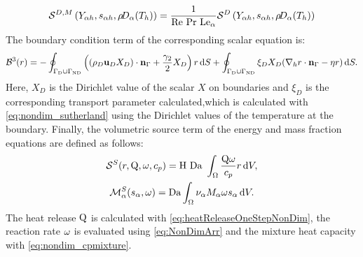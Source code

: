 \begin{equation}
\mathcal{S}^{D,M}\left(Y_{\alpha h},s_{\alpha h},\rho\!D_\alpha(T_h)\right) = \frac{1}{\text{Re}~\text{Pr}~\text{Le}_\alpha} \mathcal{S}^D\left(Y_{\alpha h},s_{\alpha h},\rho\!D_\alpha(T_h)\right)
\end{equation}
The boundary condition term of the corresponding scalar equation is:
\begin{equation}
	\mathcal{B}^3(r) =  -
	\oint_{\Gamma_{\text{D}}\cup \Gamma_{\text{ND}}}{ \left( (\rho_D\textbf{u}_D X_D)\cdot \textbf{n}_{\Gamma} + \frac{\gamma_2}{2}X_D\right)r \,\mathrm{d} S}
	+\oint_{\Gamma_{\text{D}}\cup \Gamma_{\text{ND}}} \xi_D X_D(\nabla_h r \cdot \textbf{n}_{\Gamma} - \eta r )\,\mathrm{d} S.
\end{equation}
Here, $X_D$ is the Dirichlet value of the scalar $X$ on boundaries and $\xi_D$ is the corresponding transport parameter calculated,which is calculated with \cref{eq:nondim_sutherland} using the Dirichlet values of the temperature at the boundary.
Finally, the volumetric source term of the energy and mass fraction equations are defined as follows:
\begin{gather}
	\mathcal{S}^S(r,\mathrm{Q}, \omega,c_p) =  \text{H}~\text{Da} ~ \int_{\Omega}{ \frac{\mathrm{Q} \omega}{c_p} r} \,\mathrm{d} V, \\
	\mathcal{M}^S_\alpha(s_\alpha,\omega ) =  \text{Da} \int_{\Omega}{  \nu_\alpha M_\alpha \omega s_\alpha} \,\mathrm{d} V.
\end{gather}
The heat release $\mathrm{Q}$ is calculated with \cref{eq:heatReleaseOneStepNonDim}, the reaction rate $\omega$ is evaluated using \cref{eq:NonDimArr} and the mixture heat capacity with \cref{eq:nondim_cpmixture}.

